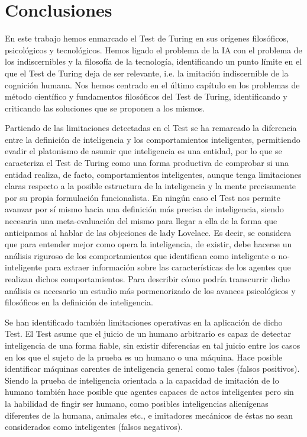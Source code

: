 \documentclass[12pt]{memoir}
\begin{document}
\chapter{Conclusiones}

En este trabajo hemos enmarcado el Test de Turing en sus orígenes filosóficos, psicológicos y tecnológicos. Hemos ligado el problema de la IA con el problema de los indiscernibles y la filosofía de la tecnología, identificando un punto límite en el que el Test de Turing deja de ser relevante, i.e. la imitación indiscernible de la cognición humana. Nos hemos centrado en el último capítulo en los problemas de método científico y fundamentos filosóficos del Test de Turing, identificando y criticando las soluciones que se proponen a los mismos.

Partiendo de las limitaciones detectadas en el Test se ha remarcado la diferencia entre la definición de inteligencia y los comportamientos inteligentes, permitiendo evadir el platonismo de asumir que inteligencia es una entidad, por lo que se caracteriza el Test de Turing como una forma productiva de comprobar si una entidad realiza, de facto, comportamientos inteligentes, aunque tenga limitaciones claras respecto a la posible estructura de la inteligencia y la mente precisamente por su propia formulación funcionalista. En ningún caso el Test nos permite avanzar por sí mismo hacia una definición más precisa de inteligencia, siendo necesaria una meta-evaluación del mismo para llegar a ella de la forma que anticipamos al hablar de las objeciones de lady Lovelace. Es decir, se considera que para entender mejor como opera la inteligencia, de existir, debe hacerse un análisis riguroso de los comportamientos que identifican como inteligente o no-inteligente para extraer información sobre las características de los agentes que realizan dichos comportamientos. Para describir cómo podría transcurrir dicho análisis es necesario un estudio más pormenorizado de los avances psicológicos y filosóficos en la definición de inteligencia.

Se han identificado también limitaciones operativas en la aplicación de dicho Test. El Test asume que el juicio de un humano arbitrario es capaz de detectar inteligencia de una forma fiable, sin existir diferencias en tal juicio entre los casos en los que el sujeto de la prueba es un humano o una máquina. Hace posible identificar máquinas carentes de inteligencia general como tales (falsos positivos). Siendo la prueba de inteligencia orientada a la capacidad de imitación de lo humano también hace posible que agentes capaces de actos inteligentes pero sin la habilidad de fingir ser humano, como posibles inteligencias alienígenas diferentes de la humana, animales etc., e imitadores mecánicos de éstas no sean considerados como inteligentes (falsos negativos).
\end{document}
